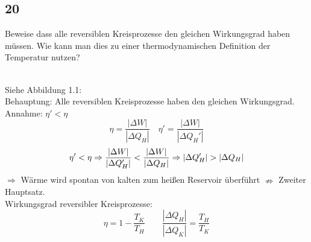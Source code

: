 \documentclass[12pt,a4paper]{report}
\newenvironment{myfrag}{\begin{it}}{\end{it}\vspace{3mm}\par}
\numberwithin{equation}{section}
\begin{document}
\subsection{20}
\begin{myfrag}

Beweise dass alle reversiblen Kreisprozesse den gleichen Wirkungsgrad haben
müssen. Wie kann man dies zu einer thermodynamischen Definition der
Temperatur nutzen?
\end{myfrag} \quad \\
Siehe Abbildung 1.1: \\[2ex]
Behauptung: Alle reversiblen Kreisprozesse haben den gleichen Wirkungsgrad.\\[2ex]
Annahme: $\eta' <\eta$ \\[2ex]
$$\eta = \dfrac{|\Delta W|}{|\Delta Q_H |} \quad \eta' = \dfrac{|\Delta W|}{|\Delta Q_H' |}$$ 
$$\eta' < \eta \Rightarrow \dfrac{|\Delta W|}{|\Delta Q_H' |} < \dfrac{|\Delta W|}{|\Delta Q_H |} \\ \Rightarrow | \Delta Q_H'| > | \Delta Q_H | $$
$\Rightarrow $ Wärme wird spontan von kalten zum heißen Reservoir überführt $\nRightarrow$ Zweiter Hauptsatz. \\[2ex]
Wirkungsgrad reversibler Kreisprozesse: \\
$$\eta = 1 - \dfrac{T_K}{T_H} \qquad \dfrac{|\Delta Q_H|}{|\Delta Q_K|} = \dfrac{T_H}{T_K}$$
 
\end{document}
